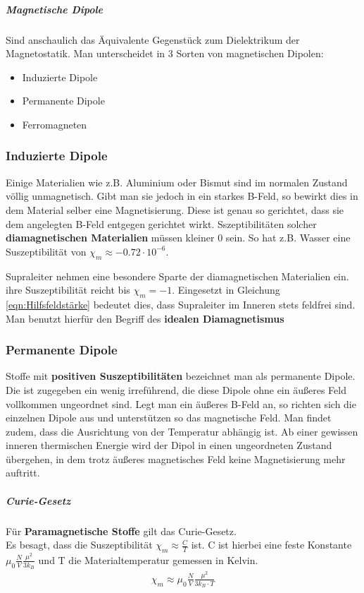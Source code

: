 \subparagraph{Magnetische Dipole} Sind anschaulich das Äquivalente Gegenstück zum Dielektrikum der Magnetostatik. Man unterscheidet in 3 Sorten von magnetischen Dipolen:
\begin{itemize}
\item Induzierte Dipole
\item Permanente Dipole
\item Ferromagneten
\end{itemize}
\subsubsection{Induzierte Dipole} Einige Materialien wie z.B. Aluminium oder Bismut sind im normalen Zustand völlig unmagnetisch. Gibt man sie jedoch in ein starkes B-Feld, so bewirkt dies in dem Material selber eine Magnetisierung. Diese ist genau so gerichtet, dass sie dem angelegten B-Feld entgegen gerichtet wirkt.
Sszeptibilitäten solcher \textbf{diamagnetischen Materialien} müssen kleiner 0 sein. So hat z.B. Wasser eine Suszeptibilität von $\chi_m \approx -0.72 \cdot 10^{-6}$. \par

Supraleiter nehmen eine besondere Sparte der diamagnetischen Materialien ein. ihre Suszeptibilität reicht bis $ \chi_m = -1$. Eingesetzt in Gleichung \ref{eqn:Hilfsfeldstärke} bedeutet dies, dass Supraleiter im Inneren stets feldfrei sind. Man benutzt hierfür den Begriff des \textbf{ idealen Diamagnetismus}
\subsubsection{Permanente Dipole}
Stoffe mit \textbf{positiven Suszeptibilitäten} bezeichnet man als permanente Dipole. Die ist zugegeben ein wenig irreführend, die diese Dipole ohne ein äußeres Feld vollkommen ungeordnet sind. Legt man ein äußeres B-Feld an, so richten sich die einzelnen Dipole aus und unterstützen so das magnetische Feld.
Man findet zudem, dass die Ausrichtung von der Temperatur abhängig ist. Ab einer gewissen inneren thermischen Energie wird der Dipol in einen ungeordneten Zustand übergehen, in dem trotz äußeres magnetisches Feld keine Magnetisierung mehr auftritt. 
\subparagraph{Curie-Gesetz} Für \textbf{Paramagnetische Stoffe} gilt das Curie-Gesetz. \\
Es besagt, dass die Suszeptibilität $\chi_m \approx \frac{C}{T}$ ist. C ist hierbei eine feste Konstante $\mu_0 \tfrac{N}{V} \frac{\mu^2}{3k_B} $ und T die Materialtemperatur gemessen in Kelvin.
\begin{align} \label{eqn:Curie-Gesetz}
\boxed{\chi_m \approx \mu_0 \tfrac{N}{V} \frac{\mu^2}{3k_B \cdot T}}
\end{align}
